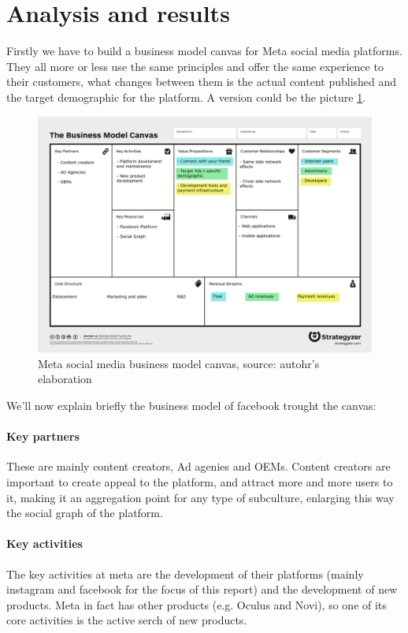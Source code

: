 \section{Analysis and results}
Firstly we have to build a business model canvas for Meta social media
platforms. They all more or less use the same principles and offer the
same experience to their customers, what changes between them is the
actual content published and the target demographic for the platform.
A version could be the picture \ref{fig:fbcanvas}.

\begin{figure}[ht]
  \centering
  \includegraphics[width=.8\textwidth]{images/fbcanvas.png}
  \caption{Meta social media business model canvas, source: autohr's
    elaboration}
  \label{fig:fbcanvas}
\end{figure}

We'll now explain briefly the business model of facebook trought the
canvas:

\paragraph{Key partners}
These are mainly content creators, Ad agenies and OEMs. Content
creators are important to create appeal to the platform, and attract
more and more users to it, making it an aggregation point for any type
of subculture, enlarging this way the social graph of the platform.

\paragraph{Key activities}
The key activities at meta are the development of their platforms
(mainly instagram and facebook for the focus of this report) and the
development of new products. Meta in fact has other products
(e.g. Oculus and Novi), so one of its core activities is the active
serch of new products.

